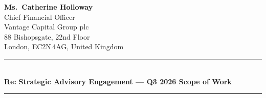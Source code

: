 \documentclass[10.5pt, a4paper]{article}
\newlength{\sideW}  \setlength{\sideW}{13mm}
\newlength{\gutterW}\setlength{\gutterW}{14mm}
\newlength{\bodyW}
\newcommand{\bodycol}[1]{%
  \par\noindent\hspace{\sideW}\hspace{\gutterW}%
  \begin{minipage}[t]{\bodyW}\raggedright #1\end{minipage}\par%
}
\begin{document}
\vspace{5mm}

\bodycol{%
  {\color{neutral}\small
    \textbf{Ms.\ Catherine Holloway}\\[-1pt]
    Chief Financial Officer\\[-1pt]
    Vantage Capital Group plc\\[-1pt]
    88 Bishopsgate, 22nd Floor\\[-1pt]
    London, EC2N\,4AG, United Kingdom%
  }%
}

\vspace{5mm}

\bodycol{%
  {\color{gold}\rule{\bodyW}{0.6pt}}\\[3pt]
  {\color{accent}\small\bfseries Re:\enspace}%
  {\color{neutral}\small\bfseries Strategic Advisory Engagement — Q3 2026 Scope of Work}\\[2pt]
  {\color{gold}\rule{\bodyW}{0.6pt}}%
}

\vspace{5mm}
\end{document}
